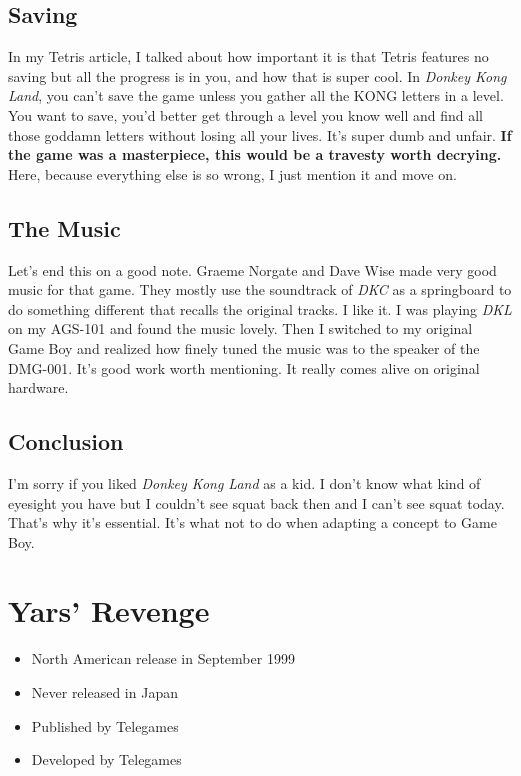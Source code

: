 \documentclass{book}
\begin{document}
\FloatBarrier\needspace{5pt}\section*{Saving}\nopagebreak[4]

In my Tetris article, I talked about how important it is that Tetris features no saving but all the progress is in you, and how that is super cool. In \emph{Donkey Kong Land}, you can’t save the game unless you gather all the KONG letters in a level. You want to save, you’d better get through a level you know well and find all those goddamn letters without losing all your lives. It’s super dumb and unfair. \textbf{If the game was a masterpiece, this would be a travesty worth decrying.} Here, because everything else is so wrong, I just mention it and move on.

\FloatBarrier\needspace{5pt}\section*{The Music}\nopagebreak[4]

Let’s end this on a good note. Graeme Norgate and Dave Wise made very good music for that game. They mostly use the soundtrack of \emph{DKC} as a springboard to do something different that recalls the original tracks. I like it. I was playing \emph{DKL} on my AGS-101 and found the music lovely. Then I switched to my original Game Boy and realized how finely tuned the music was to the speaker of the DMG-001. It’s good work worth mentioning. It really comes alive on original hardware.

\FloatBarrier\needspace{5pt}\section*{Conclusion}\nopagebreak[4]

I’m sorry if you liked \emph{Donkey Kong Land} as a kid. I don’t know what kind of eyesight you have but I couldn’t see squat back then and I can’t see squat today. That’s why it’s essential. It’s what not to do when adapting a concept to Game Boy.


\begingroup \chapter*{Yars’ Revenge} \endgroup

\begin{itemize} \setlength\itemsep{-0.4em}
\item North American release in September 1999
\item Never released in Japan
\item Published by Telegames
\item Developed by Telegames
\end{itemize}\noindent
\end{document}
